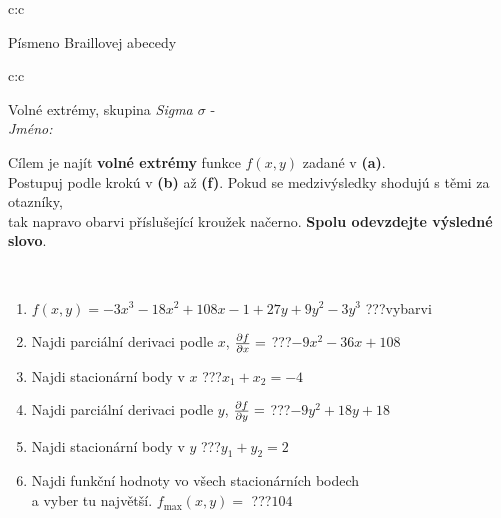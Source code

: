 \documentclass[10pt]{report}
\begin{document}
\begin{tabular}{c:c}
\begin{minipage}[c][104.5mm][t]{0.5\linewidth}
\begin{center}
\begin{minipage}{0.20\linewidth}
\begin{center}
{\small Písmeno Braillovej abecedy}
\end{center}
\end{minipage}
\end{center}
\end{minipage}
%
\end{tabular}
\newpage
\thispagestyle{empty}
\begin{tabular}{c:c}
\begin{minipage}[c][104.5mm][t]{0.5\linewidth}
\begin{center}
\vspace{7mm}
{\huge Volné extrémy, skupina \textit{Sigma $\sigma$} -}\\[5mm]
\textit{Jméno:}\phantom{xxxxxxxxxxxxxxxxxxxxxxxxxxxxxxxxxxxxxxxxxxxxxxxxxxxxxxxxxxxxxxxxx}\\[5mm]
\begin{minipage}{0.95\linewidth}
\begin{center}
Cílem je najít \textbf{volné extrémy} funkce $f(x,y)$ zadané v \textbf{(a)}.\\Postupuj podle krokú v \textbf{(b)} až \textbf{(f)}. Pokud se medzivýsledky shodujú s těmi za otazníky,\\tak napravo obarvi příslušející kroužek načerno. \textbf{Spolu odevzdejte výsledné slovo}.
\end{center}
\end{minipage}
\\[1mm]
\begin{minipage}{0.79\linewidth}
\begin{center}
\begin{varwidth}{\linewidth}
\begin{enumerate}
\normalsize
\item $f(x,y)=-3x^3-18x^2+108x-1+27y+9y^2-3y^3$\quad \dotfill\; ???\;\dotfill \quad vybarvi
\item Najdi parciální derivaci podle $x$, $\pdv{f}{x}=$\quad \dotfill\; ???\;\dotfill \quad $-9x^2-36x+108$
\item Najdi stacionární body v $x$\quad \dotfill\; ???\;\dotfill \quad $x_1+x_2=-4$
\item Najdi parciální derivaci podle $y$, $\pdv{f}{y}=$\quad \dotfill\; ???\;\dotfill \quad $-9y^2+18y+18$
\item Najdi stacionární body v $y$\quad \dotfill\; ???\;\dotfill \quad $y_1+y_2=2$
\item Najdi funkční hodnoty vo všech stacionárních bodech \\ \phantom{xxxxxx} a vyber tu najvětší. $f_{\text{max}}(x,y)=$\quad \dotfill\; ???\;\dotfill \quad $104$

\end{enumerate}
\end{varwidth}
\end{center}
\end{minipage}
\end{center}
\end{minipage}
\end{tabular}
\end{document}
